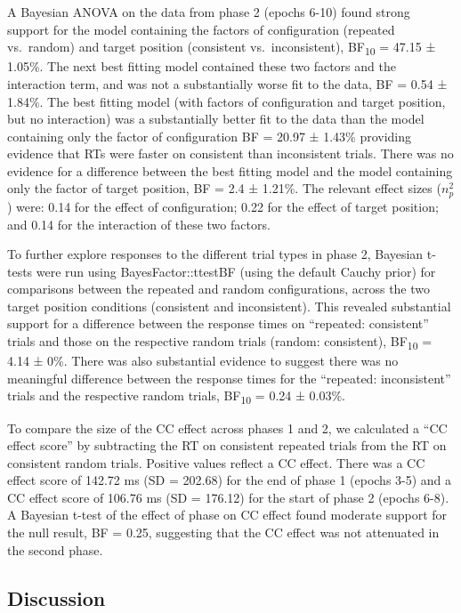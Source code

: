 \documentclass[
  man,
  floatsintext,
  longtable,
  nolmodern,
  notxfonts,
  notimes,
  colorlinks=true,linkcolor=blue,citecolor=blue,urlcolor=blue]{apa7}
\begin{document}
A Bayesian ANOVA on the data from phase 2 (epochs 6-10) found strong
support for the model containing the factors of configuration (repeated
vs.~random) and target position (consistent vs.~inconsistent),
BF\textsubscript{10} = 47.15 ± 1.05\%. The next best fitting model
contained these two factors and the interaction term, and was not a
substantially worse fit to the data, BF = 0.54 ± 1.84\%. The best
fitting model (with factors of configuration and target position, but no
interaction) was a substantially better fit to the data than the model
containing only the factor of configuration BF = 20.97 ± 1.43\%
providing evidence that RTs were faster on consistent than inconsistent
trials. There was no evidence for a difference between the best fitting
model and the model containing only the factor of target position, BF =
2.4 ± 1.21\%. The relevant effect sizes (\(n^2_p\)) were: 0.14 for the
effect of configuration; 0.22 for the effect of target position; and
0.14 for the interaction of these two factors.

To further explore responses to the different trial types in phase 2,
Bayesian t-tests were run using BayesFactor::ttestBF (using the default
Cauchy prior) for comparisons between the repeated and random
configurations, across the two target position conditions (consistent
and inconsistent). This revealed substantial support for a difference
between the response times on ``repeated: consistent'' trials and those
on the respective random trials (random: consistent),
BF\textsubscript{10} = 4.14 ± 0\%. There was also substantial evidence
to suggest there was no meaningful difference between the response times
for the ``repeated: inconsistent'' trials and the respective random
trials, BF\textsubscript{10} = 0.24 ± 0.03\%.

To compare the size of the CC effect across phases 1 and 2, we
calculated a ``CC effect score'' by subtracting the RT on consistent
repeated trials from the RT on consistent random trials. Positive values
reflect a CC effect. There was a CC effect score of 142.72 ms (SD =
202.68) for the end of phase 1 (epochs 3-5) and a CC effect score of
106.76 ms (SD = 176.12) for the start of phase 2 (epochs 6-8). A
Bayesian t-test of the effect of phase on CC effect found moderate
support for the null result, BF = 0.25, suggesting that the CC effect
was not attenuated in the second phase.

\subsection{Discussion}\label{discussion}
\end{document}
